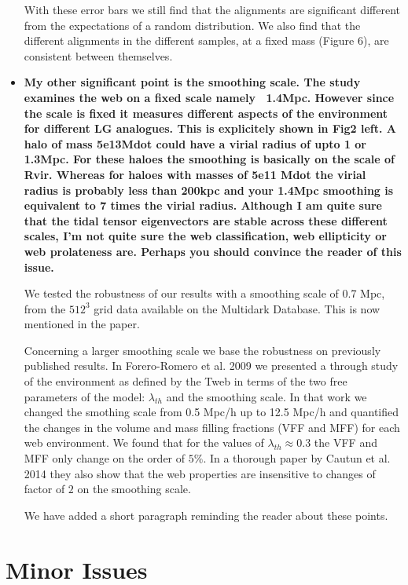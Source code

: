 \documentclass{article}
\begin{document}
\begin{itemize}
With these error bars we still find that the alignments are
significant different from the expectations of a random
distribution. We also find that the different alignments in the
different samples, at a fixed mass (Figure 6), are consistent between
themselves.  

\item
{\bf My other significant point is the smoothing scale. The study
  examines the web on a fixed scale namely ~1.4Mpc. However since the
  scale is fixed it measures different aspects of the environment for
  different LG analogues. This is explicitely shown in Fig2 left. A
  halo of mass 5e13Mdot could have a virial radius of upto 1 or
  1.3Mpc. For these haloes the smoothing is basically on the scale of
  Rvir. Whereas for haloes with masses of 5e11 Mdot the virial radius
  is probably less than 200kpc and your 1.4Mpc smoothing is equivalent
  to 7 times the virial radius.  Although I am quite sure that the
  tidal tensor eigenvectors are stable across these different scales,
  I'm not quite sure the web classification, web ellipticity or web
  prolateness are. Perhaps you should convince the reader of this
  issue.} 


We tested the robustness of our results with a smoothing scale of 0.7
Mpc, from the $512^3$ grid data available on the Multidark
Database. This is now mentioned in the paper.  

Concerning a larger smoothing scale we base the robustness on previously
published results. In Forero-Romero et al. 2009  we presented a
through study of the environment as defined by the Tweb in terms of
the two free parameters of the model: $\lambda_{th}$ and the smoothing
scale. In that work we changed the smothing scale from 0.5 Mpc/h up to
12.5 Mpc/h and quantified the changes in the volume and mass filling
fractions (VFF and MFF) for each web environment. We found that for
the values of $\lambda_{th}\approx 0.3$ the VFF and MFF only change on
the order of $5\%$. In a thorough paper by Cautun et al. 2014 they
also show that the web properties are insensitive to changes of factor
of $2$ on the smoothing scale. 

We have added a short paragraph reminding the reader about these points. 
\end{itemize}

\section{Minor Issues}
\end{document}
